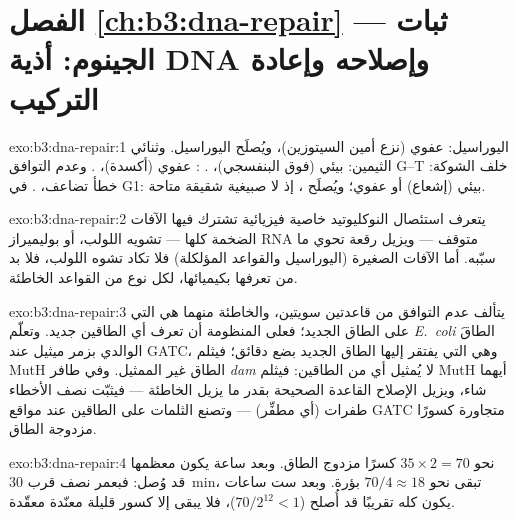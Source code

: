 \section*{الفصل \ref{ch:b3:dna-repair} --- ثبات الجينوم: أذية DNA وإصلاحه وإعادة التركيب}

\begin{solution}{exo:b3:dna-repair:1}
اليوراسيل: عفوي (نزع أمين السيتوزين)، ويُصلَح 
 اليوراسيل. وثنائي الثيمين: بيئي (فوق البنفسجي)، . : عفوي (أكسدة)،   . وعدم التوافق G--T خلف الشوكة:
خطأ تضاعف، .  في G1:
بيئي (إشعاع) أو عفوي؛ ويُصلَح ،
إذ لا صبيغية شقيقة متاحة.
\end{solution}

\begin{solution}{exo:b3:dna-repair:2}
يتعرف استئصال النوكليوتيد خاصية فيزيائية تشترك فيها الآفات الضخمة
كلها --- تشويه اللولب، أو بوليميراز RNA متوقف
--- ويزيل رقعة تحوي ما سبّبه. أما الآفات الصغيرة
(اليوراسيل  والقواعد المؤلكلة) فلا تكاد تشوه اللولب،
فلا بد من تعرفها بكيميائها،  لكل نوع من القواعد
الخاطئة.
\end{solution}

\begin{solution}{exo:b3:dna-repair:3}
يتألف عدم التوافق من قاعدتين سويتين، والخاطئة منهما هي التي على
الطاق الجديد؛ فعلى المنظومة أن تعرف أي الطاقين جديد. وتعلّم
\emph{E.~coli} الطاقَ الوالدي بزمر ميثيل عند GATC،
وهي التي يفتقر إليها الطاق الجديد بضع دقائق؛ فيثلم MutH الطاق
غير الممثيل. وفي طافر \emph{dam} لا يُمثيل أي من الطاقين:
فيثلم MutH أيهما شاء، ويزيل الإصلاح القاعدة الصحيحة بقدر ما يزيل
الخاطئة --- فيثبّت نصف الأخطاء طفرات
(أي مطفِّر) --- وتصنع الثلمات على الطاقين عند مواقع GATC متجاورة
كسورًا مزدوجة الطاق.
\end{solution}

\begin{solution}{exo:b3:dna-repair:4}
نحو $35\times 2 = 70$ كسرًا مزدوج الطاق. وبعد ساعة يكون معظمها قد
وُصل: فبعمر نصف قرب \qty{30}{min}، تبقى نحو $70/4 \approx 18$
بؤرة. وبعد ست ساعات يكون كله تقريبًا قد أُصلح ($70/2^{12} < 1$)،
فلا يبقى إلا كسور قليلة معنّدة معقّدة.
\end{solution}

